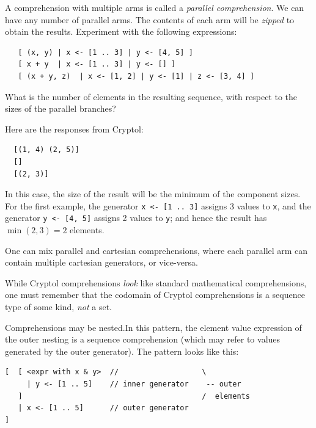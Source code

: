 \begin{Exercise}\label{ex:seq:5}\indParallel\indComp
  A comprehension with multiple arms is called a {\em parallel
    comprehension}.  We can have any number of parallel arms. The
  contents of each arm will be {\em zipped} to obtain the results.
  Experiment with the following expressions:
\begin{Verbatim}
   [ (x, y) | x <- [1 .. 3] | y <- [4, 5] ]
   [ x + y  | x <- [1 .. 3] | y <- [] ]
   [ (x + y, z)  | x <- [1, 2] | y <- [1] | z <- [3, 4] ]
\end{Verbatim}
What is the number of elements in the resulting sequence, with respect
to the sizes of the parallel branches?
\end{Exercise}
\begin{Answer}
Here are the responses from Cryptol:
\begin{Verbatim}
  [(1, 4) (2, 5)]
  []
  [(2, 3)]
\end{Verbatim}
In this case, the size of the result will be the minimum of the
component sizes. For the first example, the generator {\tt x <- [1
  .. 3]} assigns 3 values to {\tt x}, and the generator {\tt y <- [4,
  5]} assigns 2 values to {\tt y}; and hence the result has $\min(2,3)
= 2$ elements.
\end{Answer}

\begin{tip}
  One can mix parallel and cartesian comprehensions, where each
  parallel arm can contain multiple cartesian
  generators, or vice-versa.\indComp\indCartesian\indParallel
\end{tip}

\begin{tip}
  While Cryptol comprehensions \emph{look} like standard mathematical
  comprehensions, one must remember that the codomain of Cryptol
  comprehensions is a sequence type of some kind, \emph{not} a set.
\end{tip}

Comprehensions may be nested.\indNestedComp In this pattern, the
element value expression of the outer nesting is a sequence
comprehension (which may refer to values generated by the outer
generator). The pattern looks like this:

\begin{minipage}{\textwidth}  %
\begin{Verbatim}
[  [ <expr with x & y>  //                   \
     | y <- [1 .. 5]    // inner generator    -- outer
   ]                                         /  elements
   | x <- [1 .. 5]      // outer generator
]
\end{Verbatim}
\end{minipage}


